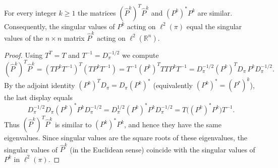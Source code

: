 \documentclass[10pt,a4paper]{amsart}
\begin{document}
\begin{theorem}
\label{thm:similar_isomorphism}
For every integer $k\ge1$ the matrices $(\hat P^{k})^{T}\hat P^{k}$ and $(P^{k})^{*}P^{k}$ are similar. Consequently, the singular values of $P^{k}$ acting on $\ell^2(\pi)$ equal the singular values of the $n\times n$ matrix $\hat P^{k}$ acting on $\ell^2(\mathbb{R}^n)$. 
\end{theorem}

\begin{proof}
Using $T^T=T$ and $T^{-1}=D_\pi^{-1/2}$ we compute
\[
(\hat P^{k})^{T}\hat P^{k}
= (T P^{k} T^{-1})^{T}(T P^{k} T^{-1})
= T^{-1}(P^{k})^{T} T T P^{k} T^{-1}
= D_\pi^{-1/2} (P^{k})^{T} D_\pi\, P^{k} D_\pi^{-1/2}.
\]
By the adjoint identity $(P^{k})^{T} D_\pi = D_\pi (P^{k})^{*}$ (equivalently $(P^{k})^*=(P^*)^k$), the last display equals
\[
D_\pi^{-1/2} D_\pi (P^{k})^{*}P^{k} D_\pi^{-1/2} = D_\pi^{1/2} (P^{k})^{*}P^{k} D_\pi^{-1/2}
= T\big((P^{k})^{*}P^{k}\big)T^{-1}.
\]
Thus $(\hat P^{k})^{T}\hat P^{k}$ is similar to $(P^{k})^{*}P^{k}$, and hence they have the same eigenvalues. Since singular values are the square roots of these eigenvalues, the singular values of $\hat P^{k}$ (in the Euclidean sense) coincide with the singular values of $P^{k}$ in $\ell^2(\pi)$.
\end{proof}
\end{document}

